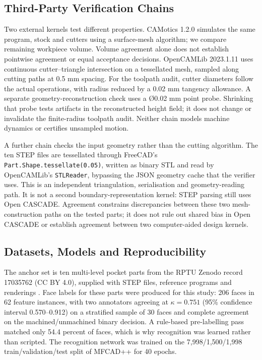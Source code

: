 \subsection{Third-Party Verification Chains}

Two external kernels test different properties. CAMotics 1.2.0 \cite{CAMotics2020} simulates the same program, stock and cutters using a surface-mesh algorithm; we compare remaining workpiece volume. Volume agreement alone does not establish pointwise agreement or equal acceptance decisions. OpenCAMLib 2023.1.11 \cite{OpenCAMLib2023} uses continuous cutter--triangle intersection on a tessellated mesh, sampled along cutting paths at 0.5 mm spacing. For the toolpath audit, cutter diameters follow the actual operations, with radius reduced by a 0.02 mm tangency allowance. A separate geometry-reconstruction check uses a Ø0.02 mm point probe. Shrinking that probe tests artifacts in the reconstructed height field; it does not change or invalidate the finite-radius toolpath audit. Neither chain models machine dynamics or certifies unsampled motion.

A further chain checks the input geometry rather than the cutting algorithm. The ten STEP files are tessellated through FreeCAD's \texttt{Part.Shape.tessellate(0.05)}, written as binary STL and read by OpenCAMLib's \texttt{STLReader}, bypassing the JSON geometry cache that the verifier uses. This is an independent triangulation, serialisation and geometry-reading path. It is not a second boundary-representation kernel: STEP parsing still uses Open CASCADE. Agreement constrains discrepancies between these two mesh-construction paths on the tested parts; it does not rule out shared bias in Open CASCADE or establish agreement between two computer-aided design kernels.

\subsection{Datasets, Models and Reproducibility}

The anchor set is ten multi-level pocket parts from the RPTU Zenodo record 17035762 (CC BY 4.0), supplied with STEP files, reference programs and renderings \cite{RPTU2025}. Face labels for these parts were produced for this study: 206 faces in 62 feature instances, with two annotators agreeing at $\kappa=0.751$ (95\% confidence interval 0.570--0.912) on a stratified sample of 30 faces and complete agreement on the machined/unmachined binary decision. A rule-based pre-labelling pass matched only 54.4 percent of faces, which is why recognition was learned rather than scripted. The recognition network was trained on the 7,998/1,500/1,998 train/validation/test split of MFCAD++ for 40 epochs.

